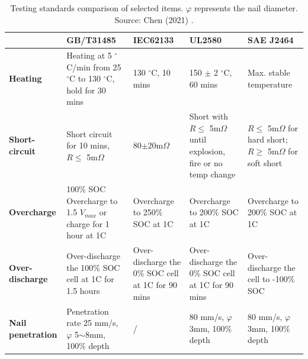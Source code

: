 \begin{table}[ht]
    \centering
    \begin{scriptsize}
        \begin{tabular}{|P{20mm} P{29mm} P{29mm} P{29mm} P{29mm}|}
            \hline
            & \textbf{GB/T31485} & \textbf{IEC62133} & \textbf{UL2580} & \textbf{SAE J2464}\T\B \\
            \hline \hline

            \textbf{Heating} & Heating at 5 $^\circ$C/min from 25 $^\circ$C to 130 $^\circ$C, hold for 30 mins \vspace{3mm}& 130 $^\circ$C, 10 mins & 150 $\pm$ 2 $^\circ$C, 60 mins & Max. stable temperature\T\B\\

            \textbf{Short-circuit} & Short circuit for 10 mins, $R\leq$ 5m$\Omega$ & 80$\pm$20m$\Omega$ & Short with $R\leq$ 5m$\Omega$ until explosion, fire or no temp change & $R\leq$ 5m$\Omega$ for hard short; $R\geq$ 5m$\Omega$ for soft short\vspace{3mm}\T\B\\

            \textbf{Overcharge} & 100\% SOC Overcharge to 1.5 $V_{max}$ or charge for 1 hour at 1C \vspace{3mm}& Overcharge to 250\% SOC at 1C & Overcharge to 200\% SOC at 1C & Overcharge to 200\% SOC at 1C\T\B\\

            \textbf{Over-discharge} & Over-discharge the 100\% SOC cell at 1C for 1.5 hours \vspace{3mm}& Over-discharge the 0\% SOC cell at 1C for 90 mins & Over-discharge the 0\% SOC cell at 1C for 90 mins & Over-discharge the cell to -100\% SOC\T\B\\

            \textbf{Nail penetration} & Penetration rate 25 mm/s, $\varphi$ 5$\sim$8mm, 100\% depth & / & 80 mm/s, $\varphi$ 3mm, 100\% depth & 80 mm/s, $\varphi$ 3mm, 100\% depth\T\B\\
            \hline
        \end{tabular}
        \\[10pt]
        \caption[Testing standards coparison]{Testing standards comparison of selected items. $\varphi$ represents the nail diameter. Source: Chen (2021) \cite{chen2021review}.}
        \label{table:standards}
    \end{scriptsize}
\end{table}

